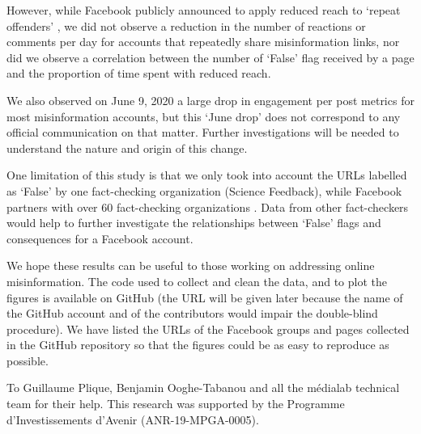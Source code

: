 \documentclass[sigconf]{acmart}
\begin{document}
However, while Facebook publicly announced to apply reduced reach to `repeat offenders' \cite{FacebookMeasuresAgainstMisinformation}, we did not observe a reduction in the number of reactions or comments per day for accounts that repeatedly share misinformation links, nor did we observe a correlation between the number of `False' flag received by a page and the proportion of time spent with reduced reach.

We also observed on June 9, 2020 a large drop in engagement per post metrics for most misinformation accounts, but this `June drop' does not correspond to any official communication on that matter. Further investigations will be needed to understand the nature and origin of this change.

One limitation of this study is that we only took into account the URLs labelled as `False' by one fact-checking organization (Science Feedback), while Facebook partners with over 60 fact-checking organizations \cite{FacebookPartners}. Data from other fact-checkers would help to further investigate the relationships between `False' flags and consequences for a Facebook account.

We hope these results can be useful to those working on addressing online misinformation. The code used to collect and clean the data, and to plot the figures is available on GitHub (the URL will be given later because the name of the GitHub account and of the contributors would impair the double-blind procedure). We have listed the URLs of the Facebook groups and pages collected in the GitHub repository so that the figures could be as easy to reproduce as possible.

\begin{acks}
To Guillaume Plique, Benjamin Ooghe-Tabanou and all the m\'edialab technical team for their help. This research was supported by the Programme d'Investissements d'Avenir (ANR-19-MPGA-0005).
\end{acks}



\end{document}
